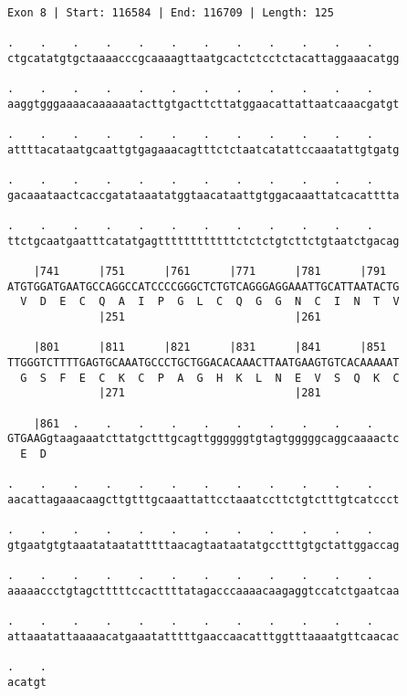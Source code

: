 \documentclass{article}
\begin{document}
\newpage
\begin{Verbatim}
Exon 8 | Start: 116584 | End: 116709 | Length: 125
 
.    .    .    .    .    .    .    .    .    .    .    .    
ctgcatatgtgctaaaacccgcaaaagttaatgcactctcctctacattaggaaacatgg
  
.    .    .    .    .    .    .    .    .    .    .    .    
aaggtgggaaaacaaaaaatacttgtgacttcttatggaacattattaatcaaacgatgt
  
.    .    .    .    .    .    .    .    .    .    .    .    
attttacataatgcaattgtgagaaacagtttctctaatcatattccaaatattgtgatg
  
.    .    .    .    .    .    .    .    .    .    .    .    
gacaaataactcaccgatataaatatggtaacataattgtggacaaattatcacatttta
  
.    .    .    .    .    .    .    .    .    .    .    .    
ttctgcaatgaatttcatatgagttttttttttttctctctgtcttctgtaatctgacag
  
    |741      |751      |761      |771      |781      |791  
ATGTGGATGAATGCCAGGCCATCCCCGGGCTCTGTCAGGGAGGAAATTGCATTAATACTG
  V  D  E  C  Q  A  I  P  G  L  C  Q  G  G  N  C  I  N  T  V
              |251                          |261            
  
    |801      |811      |821      |831      |841      |851  
TTGGGTCTTTTGAGTGCAAATGCCCTGCTGGACACAAACTTAATGAAGTGTCACAAAAAT
  G  S  F  E  C  K  C  P  A  G  H  K  L  N  E  V  S  Q  K  C
              |271                          |281            
  
    |861  .    .    .    .    .    .    .    .    .    .    
GTGAAGgtaagaaatcttatgctttgcagttggggggtgtagtgggggcaggcaaaactc
  E  D                                                      
  
.    .    .    .    .    .    .    .    .    .    .    .    
aacattagaaacaagcttgtttgcaaattattcctaaatccttctgtctttgtcatccct
  
.    .    .    .    .    .    .    .    .    .    .    .    
gtgaatgtgtaaatataatatttttaacagtaataatatgcctttgtgctattggaccag
  
.    .    .    .    .    .    .    .    .    .    .    .    
aaaaaccctgtagctttttccacttttatagacccaaaacaagaggtccatctgaatcaa
  
.    .    .    .    .    .    .    .    .    .    .    .    
attaaatattaaaaacatgaaatatttttgaaccaacatttggtttaaaatgttcaacac
  
.    .
acatgt
\end{Verbatim}
\newpage
\end{document}
